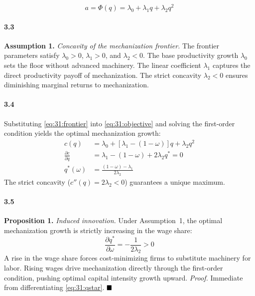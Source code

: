 \begin{equation}
	a = \Phi(q) = \lambda_0 + \lambda_1 q + \lambda_2 q^2
	\label{eq:31:frontier}
\end{equation}

\paragraph{3.3}
\textbf{Assumption 1.} \textit{Concavity of the
	mechanization frontier.} The frontier parameters satisfy
$\lambda_0 > 0$, $\lambda_1 > 0$, and $\lambda_2 < 0$. The
base productivity growth $\lambda_0$ sets the floor without
advanced machinery. The linear coefficient $\lambda_1$
captures the direct productivity payoff of mechanization. The
strict concavity $\lambda_2 < 0$ ensures diminishing marginal
returns to mechanization.

\paragraph{3.4}
Substituting \eqref{eq:31:frontier} into
\eqref{eq:31:objective} and solving the first-order condition
yields the optimal mechanization growth:
\begin{align}
	c(q) &= \lambda_0 + \left[\lambda_1 - (1-\omega)\right] q
	+ \lambda_2 q^2 \label{eq:31:unconstrained} \\
	\frac{\partial c}{\partial q} &= \lambda_1 - (1-\omega) + 2\lambda_2 q^*
	= 0 \label{eq:31:foc} \\
	q^*(\omega) &= \frac{(1-\omega) - \lambda_1}{2\lambda_2}
	\label{eq:31:qstar}
\end{align}
The strict concavity ($c''(q) = 2\lambda_2 < 0$) guarantees
a unique maximum.

\paragraph{3.5}
\textbf{Proposition 1.} \textit{Induced innovation.} Under
Assumption~1, the optimal mechanization growth is strictly
increasing in the wage share:
\begin{equation}
	\frac{\partial q^*}{\partial \omega}
	= -\frac{1}{2\lambda_2} > 0
	\label{eq:31:comparative_static}
\end{equation}
A rise in the wage share forces cost-minimizing firms to
substitute machinery for labor. Rising wages drive
mechanization directly through the first-order condition,
pushing optimal capital intensity growth upward.
\textit{Proof.} Immediate from differentiating
\eqref{eq:31:qstar}. $\hfill\blacksquare$

